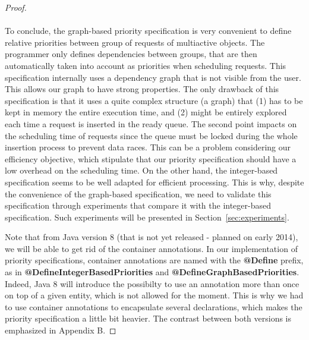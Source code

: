 \documentclass[11pt]{report}
\begin{document}
\begin{proof}

\paragraph{}
To conclude, the graph-based priority specification is very convenient to define relative priorities between group of requests of multiactive objects. The programmer only defines dependencies between groups, that are then automatically taken into account as priorities when scheduling requests. This specification internally uses a dependency graph that is not visible from the user. This allows our graph to have strong properties. The only drawback of this specification is that it uses a quite complex structure (a graph) that (1) has to be kept in memory the entire execution time, and (2) might be entirely explored each time a request is inserted in the ready queue. The second point impacts on the scheduling time of requests since the queue must be locked during the whole insertion process to prevent data races. This can be a problem considering our efficiency objective, which stipulate that our priority specification should have a low overhead on the scheduling time. On the other hand, the integer-based specification seems to be well adapted for efficient processing. This is why, despite the convenience of the graph-based specification, we need to validate this specification through experiments that compare it with the integer-based specification. Such experiments will be presented in Section~\ref{sec:experiments}.

Note that from Java version 8 (that is not yet released - planned on early 2014), we will be able to get rid of the container annotations. In our implementation of priority specifications, container annotations are named with the \textbf{@Define} prefix, as in \textbf{@DefineIntegerBasedPriorities} and \textbf{@DefineGraphBasedPriorities}. Indeed, Java 8 will introduce the possibilty to use an annotation more than once on top of a given entity, which is not allowed for the moment. This is why we had to use container annotations to encapsulate several declarations, which makes the priority specification a little bit heavier. The contrast between both versions is emphasized in Appendix B.


\end{proof}
\end{document}
